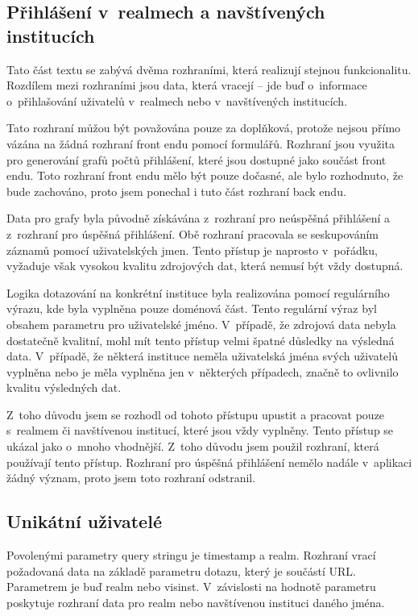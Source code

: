 \documentclass[thesis=M,czech]{FITthesis}[2012/06/26]
\begin{document}
    \subsection{Přihlášení v~realmech a navštívených institucích}
      Tato část textu se zabývá dvěma rozhraními, která
      realizují stejnou funkcionalitu.
      Rozdílem mezi rozhraními jsou data, která vracejí -- jde buď
      o~informace o~přihlašování uživatelů v~realmech nebo v~navštívených institucích.

      Tato rozhraní můžou být považována pouze za doplňková,
      protože nejsou přímo vázána na žádná rozhraní front endu pomocí formulářů.
      Rozhraní jsou využita pro generování grafů počtů přihlášení,
      které jsou dostupné jako součást front endu.
      Toto rozhraní front endu mělo být pouze dočasné, 
      ale bylo rozhodnuto, že bude zachováno, proto jsem ponechal i tuto část rozhraní back endu.

      Data pro grafy byla původně získávána z~rozhraní pro neúspěšná přihlášení
      a z~rozhraní pro úspěšná přihlášení.
      Obě rozhraní pracovala se seskupováním záznamů pomocí uživatelských jmen.
      Tento přístup je naprosto v~pořádku, vyžaduje však vysokou kvalitu zdrojových dat,
      která nemusí být vždy dostupná.

      Logika dotazování na konkrétní instituce byla realizována pomocí
      regulárního výrazu, kde byla vyplněna pouze doménová část.
      Tento regulární výraz byl obsahem parametru pro uživatelské jméno.
      V~případě, že zdrojová data nebyla dostatečně kvalitní, mohl mít tento přístup 
      velmi špatné důsledky na výsledná data.
      V~případě, že některá instituce neměla uživatelská jména svých uživatelů vyplněna
      nebo je měla vyplněna jen v~některých případech, značně to ovlivnilo kvalitu výsledných dat.

      Z~toho důvodu jsem se rozhodl od tohoto přístupu upustit a pracovat pouze
      s~realmem či navštívenou institucí, které jsou vždy vyplněny.
      Tento přístup se ukázal jako o~mnoho vhodnější. 
      Z~toho důvodu jsem použil rozhraní, která používají tento přístup.
      Rozhraní pro úspěšná přihlášení nemělo nadále v~aplikaci žádný význam, 
      proto jsem toto rozhraní odstranil.

    \subsection{Unikátní uživatelé}
      
      Povolenými parametry query stringu je timestamp a realm.
      Rozhraní vrací požadovaná data na základě parametru dotazu, který je součástí URL.
      Parametrem je buď realm nebo visinst.
      V~závislosti na hodnotě parametru poskytuje rozhraní data
      pro realm nebo navštívenou instituci daného jména.
      
\end{document}
